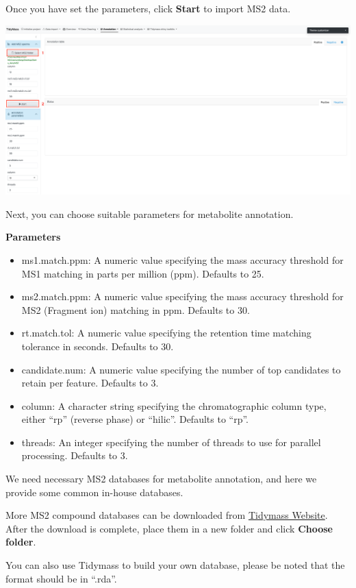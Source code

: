 \documentclass[
]{book}
\providecommand{\tightlist}{%
  \setlength{\itemsep}{0pt}\setlength{\parskip}{0pt}}
\begin{document}
Once you have set the parameters, click \textbf{Start} to import MS2 data.

\includegraphics{figures/metabolite_annotation.png}

Next, you can choose suitable parameters for metabolite annotation.

\textbf{Parameters}

\begin{itemize}
\tightlist
\item
  ms1.match.ppm: A numeric value specifying the mass accuracy threshold for MS1 matching in parts per million (ppm). Defaults to 25.
\item
  ms2.match.ppm: A numeric value specifying the mass accuracy threshold for MS2 (Fragment ion) matching in ppm. Defaults to 30.
\item
  rt.match.tol: A numeric value specifying the retention time matching tolerance in seconds. Defaults to 30.
\item
  candidate.num: A numeric value specifying the number of top candidates to retain per feature. Defaults to 3.
\item
  column: A character string specifying the chromatographic column type, either ``rp'' (reverse phase) or ``hilic''. Defaults to ``rp''.
\item
  threads: An integer specifying the number of threads to use for parallel processing. Defaults to 3.
\end{itemize}

We need necessary MS2 databases for metabolite annotation, and here we provide some common in-house databases.

More MS2 compound databases can be downloaded from \href{https://www.tidymass.org/databases/}{Tidymass Website}. After the download is complete, place them in a new folder and click \textbf{Choose folder}.

You can also use Tidymass to build your own database, please be noted that the format should be in ``.rda''.
\end{document}
